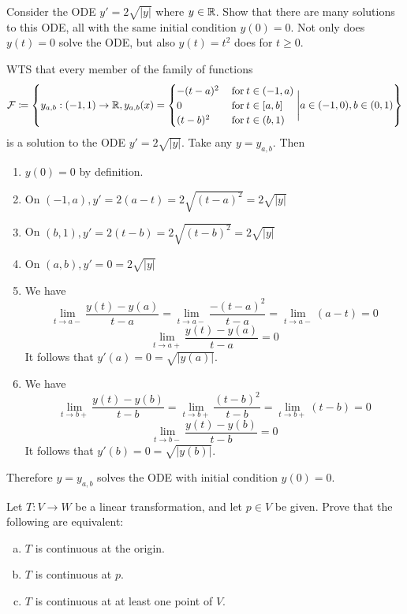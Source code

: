 \documentclass[a4paper, 12pt]{article}
\begin{document}
\begin{problem} 
Consider the ODE $y' = 2\sqrt{|y|}$ where $y \in \mathbb{R}$. Show that there are many solutions to this ODE, all with the same initial condition $y(0) = 0$. Not only does $y(t) = 0$ solve the ODE, but also $y(t) = t^2$ does for $t \geq 0$.
\end{problem}
\begin{solution}
    WTS that every member of the family of functions \[
        \mathcal{F} \coloneqq \left\{y_{a, b}: (-1, 1) \to \mathbb{R},  y_{a, b}(x) = \begin{cases}
            -(t-a)^2 & \:\text{for}\: t \in (-1, a) \\
            0        & \:\text{for}\: t \in [a, b]  \\
            (t-b)^2  & \:\text{for}\: t \in (b, 1)
        \end{cases} \Bigg| a \in (-1, 0), b \in (0, 1)\right\}
    \]
    is a solution to the ODE $y' = 2\sqrt{|y|}$. Take any $y = y_{a, b}$. Then
    \begin{enumerate}
        \item $y(0) = 0$ by definition.
        \item On $(-1, a), y' = 2(a-t) = 2\sqrt{(t-a)^2} = 2\sqrt{|y|}$
        \item On $(b, 1), y' = 2(t-b) = 2\sqrt{(t-b)^2} = 2\sqrt{|y|}$
        \item On $(a, b), y' = 0 = 2\sqrt{|y|}$
        \item We have\[
                  \lim_{t \to a-}\frac{y(t) - y(a)}{t-a} = \lim_{t \to a-} \frac{-(t-a)^2}{t-a} = \lim_{t \to a-} (a-t) = 0
              \]
              \[
                  \lim_{t \to a+}\frac{y(t) - y(a)}{t-a} = 0
              \]
              It follows that $y'(a) = 0 = \sqrt{|y(a)|}$.
        \item  We have\[
                  \lim_{t \to b+}\frac{y(t) - y(b)}{t-b} = \lim_{t \to b+} \frac{(t-b)^2}{t-b} = \lim_{t \to b+} (t-b) = 0
              \]
              \[
                  \lim_{t \to b-}\frac{y(t) - y(b)}{t-b} = 0
              \]
              It follows that $y'(b) = 0 = \sqrt{|y(b)|}$.
    \end{enumerate}
    Therefore $y = y_{a, b}$ solves the ODE with initial condition $y(0) = 0$.
\end{solution}
\begin{problem} 
Let $T: V \to W$ be a linear transformation, and let $p \in V$ be given. Prove that the following are equivalent: \begin{enumerate} [(a)]
    \item $T$ is continuous at the origin.
    \item $T$ is continuous at $p$.
    \item $T$ is continuous at at least one point of $V$.
\end{enumerate}
\end{problem}
\end{document}

